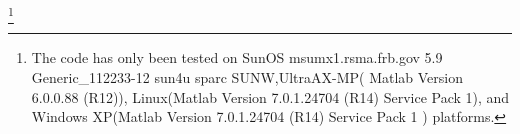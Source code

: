 \footnote{
 The code has only been tested on
SunOS msumx1.rsma.frb.gov 5.9 Generic\_112233-12 sun4u sparc SUNW,UltraAX-MP(
Matlab Version 6.0.0.88 (R12)), Linux(Matlab Version 7.0.1.24704 (R14) 
Service Pack 1), and Windows XP(Matlab Version 7.0.1.24704 (R14) Service Pack 1
) platforms.}

